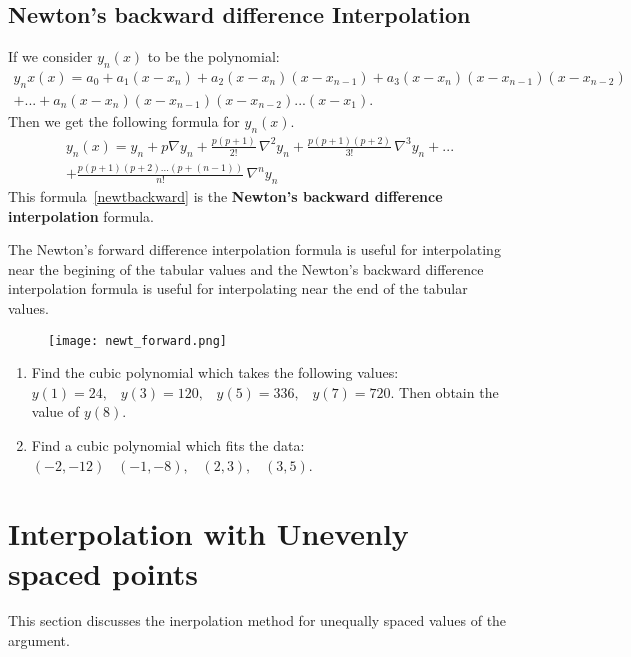 \documentclass[aima203_lecturenotes_ku.tex]{subfiles}
\begin{document}
\subsection{Newton's backward difference Interpolation}
If we consider $y_n(x)$ to be the polynomial:
\begin{equation}
  \begin{gathered}
  y_nx(x)= a_0 +a_1(x-x_n) +a_2(x-x_n)(x-x_{n-1})+a_3(x-x_n)(x-x_{n-1})(x-x_{n-2}) \\[1mm]
  + ... + a_n(x-x_n)(x-x_{n-1})(x-x_{n-2})...(x-x_1).
  \end{gathered}
\end{equation}
Then we get the following formula for $y_n(x)$.
\begin{equation}
  \label{newtbackward}
 \begin{gathered}
  y_n(x) = y_n + p \nabla y_n + \frac{p(p+1)}{2!}\, \nabla ^2 y_n + \frac{p(p+1)(p+2)}{3!}\, \nabla ^3 y_n + ... \\[1mm]
  + \frac{p(p+1)(p+2)...(p+(n-1))}{n!}\, \nabla ^n y_n
\end{gathered}
\end{equation}
This formula~\ref{newtbackward} is the \textbf{Newton's backward difference interpolation} formula.

\begin{remark}
The Newton's forward difference interpolation formula is useful for interpolating near the begining of the tabular values and the Newton's backward difference interpolation formula is useful for interpolating near the end of the tabular values.
\end{remark}

\begin{figure}[h]
  \centering
\texttt{[image: newt\_forward.png]}
\end{figure}


\begin{enumerate}
\item Find the cubic polynomial which takes the following values: $y(1)=24, \;\;\;  y(3)=120,  \;\;\; y(5)=336,  \;\;\; y(7)=720$. Then obtain the value of $y(8)$.
\item Find a cubic polynomial which fits the data: $(-2, -12)  \;\;\; (-1, -8),  \;\;\; (2,3),  \;\;\; (3,5)$.
\end{enumerate}
\section{Interpolation with Unevenly spaced points}
This section discusses the inerpolation method for unequally spaced values of the argument.
\end{document}
